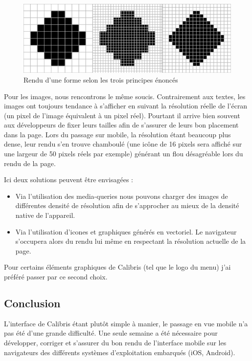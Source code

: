 \documentclass[12pt,a4paper]{book}
\begin{document}
\begin{figure}[htp]
\centering
\includegraphics[scale=0.9]{img/reso1.png}
 \caption{Rendu d'une forme selon les trois principes énoncés}
 \label{fig.resolution}
\end{figure}

Pour les images, nous rencontrons le même soucis. Contrairement aux textes, les images ont toujours tendance à s'afficher en suivant la résolution réelle de l'écran (un pixel de l'image équivalent à un pixel réel). Pourtant il arrive bien souvent aux développeurs de fixer leurs tailles afin de s'assurer de leurs bon placement dans la page. Lors du passage sur mobile, la résolution étant beaucoup plus dense, leur rendu s'en trouve chamboulé (une icône de 16 pixels sera affiché sur une largeur de 50 pixels réels par exemple) générant un flou désagréable lors du rendu de la page.

Ici deux solutions peuvent être envisagées :
\begin{itemize}
  \item Via l'utilisation des media-queries nous pouvons charger des images de différentes densité de résolution afin de s'approcher au mieux de la densité native de l'appareil. 
  \item Via l'utilisation d'icones et graphiques générés en vectoriel. Le navigateur s'occupera alors du rendu lui même en respectant la résolution actuelle de la page.
\end{itemize}

Pour certains éléments graphiques de Calibris (tel que le logo du menu) j'ai préféré passer par ce second choix.

\subsection*{Conclusion}

L'interface de Calibris étant plutôt simple à manier, le passage en vue mobile n'a pas été d'une grande difficulté. Une seule semaine a été nécessaire pour développer, corriger et s'assurer du bon rendu de l'interface mobile sur les navigateurs des différents systèmes d'exploitation embarqués (iOS, Android).
\end{document}
